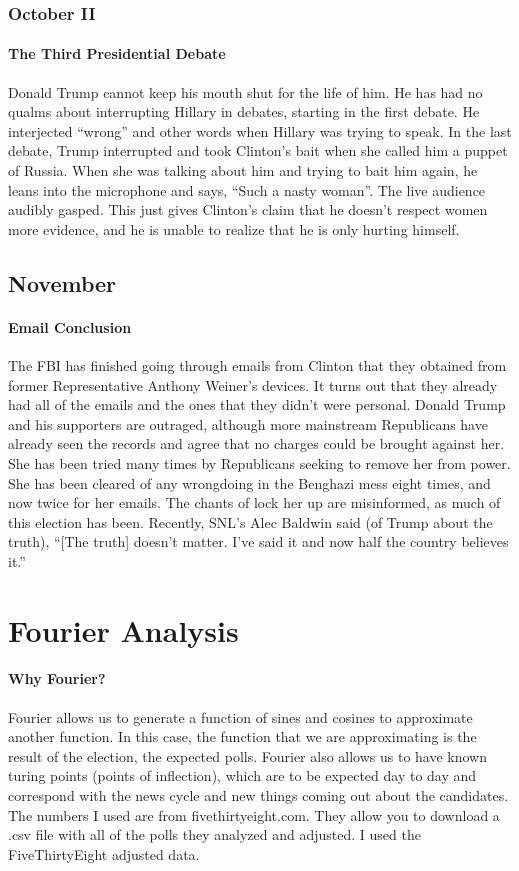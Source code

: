 \documentclass[twoside]{article}
\begin{document}
\subsubsection{October II}
\paragraph{The Third Presidential Debate} Donald Trump cannot keep his mouth shut for the life of him. He has had no qualms about interrupting Hillary in debates, starting in the first debate. He interjected “wrong” and other words when Hillary was trying to speak. In the last debate, Trump interrupted and took Clinton’s bait when she called him a puppet of Russia. When she was talking about him and trying to bait him again, he leans into the microphone and says, “Such a nasty woman”. The live audience audibly gasped. This just gives Clinton’s claim that he doesn’t respect women more evidence, and he is unable to realize that he is only hurting himself.
\newpage
\subsection{November}
\paragraph{Email Conclusion} The FBI has finished going through emails from Clinton that they obtained from former Representative Anthony Weiner’s devices. It turns out that they already had all of the emails and the ones that they didn’t were personal. Donald Trump and his supporters are outraged, although more mainstream Republicans have already seen the records and agree that no charges could be brought against her. She has been tried many times by Republicans seeking to remove her from power. She has been cleared of any wrongdoing in the Benghazi mess eight times, and now twice for her emails. The chants of lock her up are misinformed, as much of this election has been. Recently, SNL’s Alec Baldwin said (of Trump about the truth), “[The truth] doesn’t matter. I’ve said it and now half the country believes it.”
\newpage
\section{Fourier Analysis}
\vskip4cm
\paragraph{Why Fourier?} Fourier allows us to generate a function of sines and cosines to approximate another function. In this case, the function that we are approximating
is the result of the election, the expected polls. Fourier also allows us to have known turing points (points of inflection), which are to be expected day to day and correspond
with the news cycle and new things coming out about the candidates. The numbers I used are from fivethirtyeight.com. They allow you to download a .csv file with all of the polls they
analyzed and adjusted. I used the FiveThirtyEight adjusted data.
\end{document}
